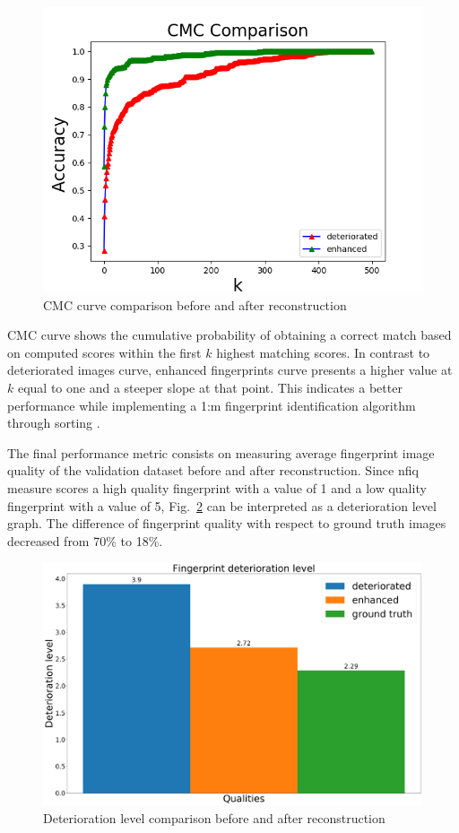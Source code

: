 \documentclass[a4paper,fleqn]{cas-dc}
\begin{document}
\begin{figure}[htbp]
\centerline{\includegraphics[scale=0.5]{figs/cmc_comparison.png}}
\caption{CMC curve comparison before and after reconstruction}
\label{fig10}
\end{figure}

CMC curve shows the cumulative probability of obtaining a correct match based on computed scores within the first $k$ highest matching scores. In contrast to deteriorated images curve, enhanced fingerprints curve presents a higher value at $k$ equal to one and a steeper slope at that point. This indicates a better performance while implementing a 1:m fingerprint identification algorithm through sorting \cite{RROCCMC}.

The final performance metric consists on measuring average fingerprint image quality of the validation dataset before and after reconstruction. Since nfiq measure scores a high quality fingerprint with a value of 1 and a low quality fingerprint with a value of 5, Fig.~\ref{fig11} can be interpreted as a deterioration level graph. The difference of fingerprint quality with respect to ground truth images decreased from 70\% to 18\%.

\begin{figure}[htbp]
\centerline{\includegraphics[scale=0.13]{figs/mean_qualities.png}}
\caption{Deterioration level comparison before and after reconstruction}
\label{fig11}
\end{figure}
\end{document}
